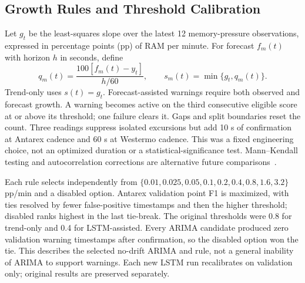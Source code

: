 \documentclass{llncs}
\begin{document}
\subsection{Growth Rules and Threshold Calibration}
Let $g_t$ be the least-squares slope over the latest 12 memory-pressure observations, expressed in percentage points (pp) of RAM per minute. For forecast $f_m(t)$ with horizon $h$ in seconds, define
\begin{equation}
q_m(t)=\frac{100[f_m(t)-y_t]}{h/60},\qquad
s_m(t)=\min\{g_t,q_m(t)\}.
\label{eq:score}
\end{equation}
Trend-only uses $s(t)=g_t$. Forecast-assisted warnings require both observed and forecast growth. A warning becomes active on the third consecutive eligible score at or above its threshold; one failure clears it. Gaps and split boundaries reset the count. Three readings suppress isolated excursions but add 10 s of confirmation at Antarex cadence and 60 s at Westermo cadence. This was a fixed engineering choice, not an optimized duration or a statistical-significance test. Mann--Kendall testing and autocorrelation corrections are alternative future comparisons~\cite{ref33,ref35}.

Each rule selects independently from $\{0.01,0.025,0.05,0.1,0.2,0.4,0.8,1.6,3.2\}$ pp/min and a disabled option. Antarex validation point F1 is maximized, with ties resolved by fewer false-positive timestamps and then the higher threshold; disabled ranks highest in the last tie-break. The original thresholds were 0.8 for trend-only and 0.4 for LSTM-assisted. Every ARIMA candidate produced zero validation warning timestamps after confirmation, so the disabled option won the tie. This describes the selected no-drift ARIMA and rule, not a general inability of ARIMA to support warnings. Each new LSTM run recalibrates on validation only; original results are preserved separately.
\end{document}
